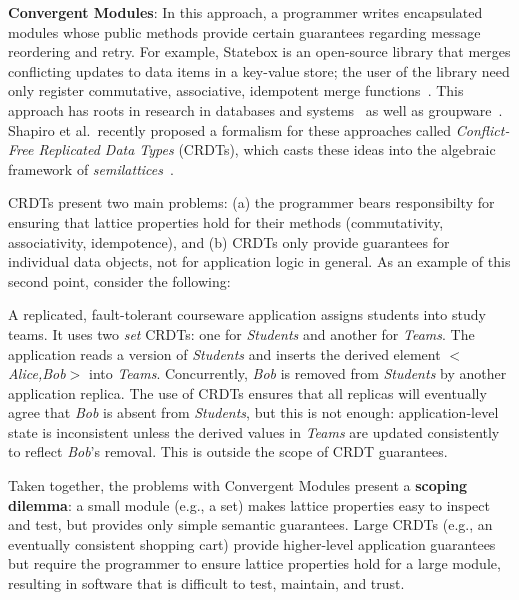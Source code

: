 \vspace{0.5em}\noindent
\textbf{Convergent Modules}: In this approach, a programmer writes encapsulated
modules whose public methods provide certain guarantees regarding message
reordering and retry. For example, Statebox is an open-source library that
merges conflicting updates to data items in a key-value store; the user of the
library need only register commutative, associative, idempotent merge
functions~\cite{statebox}. This approach has roots in research in
databases and systems~\cite{Farrag1989,Garcia-Molina1983,O'Neil1986,Helland2009,Terry1995} as well as
groupware~\cite{Ellis1989,Sun1998}.  Shapiro et al.\ recently proposed a formalism
for these approaches called \emph{Conflict-Free Replicated Data Types} (CRDTs),
which casts these ideas into the algebraic framework of {\em
  semilattices}~\cite{Shapiro2011a,Shapiro2011b}.

CRDTs present two main problems: (a) the programmer bears responsibilty for ensuring that lattice properties hold for their methods (commutativity, associativity, idempotence), and (b) CRDTs only provide guarantees for individual data objects, not for application logic in general. As an example of this second point, consider the following:

\vspace{-0.25em}
\begin{example}
A replicated, fault-tolerant courseware application assigns students into study teams.  It uses two \emph{set} CRDTs: one for \emph{Students} and another for \emph{Teams}.  The application reads a version of \emph{Students} and inserts the derived element $<$\emph{Alice,Bob}$>$ into \emph{Teams}. Concurrently, \emph{Bob} is removed from
\emph{Students} by another application replica. The use of CRDTs ensures that all replicas will
eventually agree that \emph{Bob} is absent from \emph{Students}, but this is not enough: application-level state
is inconsistent unless the derived values in \emph{Teams} are updated consistently to reflect \emph{Bob}'s
removal.  This is outside the scope of CRDT guarantees.
\end{example}

\vspace{-.25em}
Taken together, the problems with Convergent Modules present a {\bf scoping
  dilemma}: a small module (e.g., a set) makes lattice properties easy to
inspect and test, but provides only simple semantic guarantees. Large CRDTs
(e.g., an eventually consistent shopping cart) provide higher-level application
guarantees but require the programmer to ensure lattice properties hold for a
large module, resulting in software that is difficult to test, maintain, and
trust.
% 

